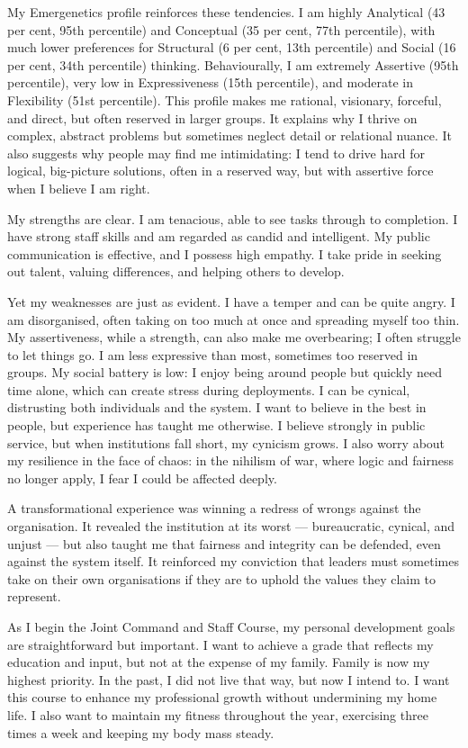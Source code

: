 My Emergenetics profile reinforces these tendencies. I am highly Analytical (43 per cent, 95th percentile) and Conceptual (35 per cent, 77th percentile), with much lower preferences for Structural (6 per cent, 13th percentile) and Social (16 per cent, 34th percentile) thinking. Behaviourally, I am extremely Assertive (95th percentile), very low in Expressiveness (15th percentile), and moderate in Flexibility (51st percentile). This profile makes me rational, visionary, forceful, and direct, but often reserved in larger groups. It explains why I thrive on complex, abstract problems but sometimes neglect detail or relational nuance. It also suggests why people may find me intimidating: I tend to drive hard for logical, big-picture solutions, often in a reserved way, but with assertive force when I believe I am right.

My strengths are clear. I am tenacious, able to see tasks through to completion. I have strong staff skills and am regarded as candid and intelligent. My public communication is effective, and I possess high empathy. I take pride in seeking out talent, valuing differences, and helping others to develop.

Yet my weaknesses are just as evident. I have a temper and can be quite angry. I am disorganised, often taking on too much at once and spreading myself too thin. My assertiveness, while a strength, can also make me overbearing; I often struggle to let things go. I am less expressive than most, sometimes too reserved in groups. My social battery is low: I enjoy being around people but quickly need time alone, which can create stress during deployments. I can be cynical, distrusting both individuals and the system. I want to believe in the best in people, but experience has taught me otherwise. I believe strongly in public service, but when institutions fall short, my cynicism grows. I also worry about my resilience in the face of chaos: in the nihilism of war, where logic and fairness no longer apply, I fear I could be affected deeply.

A transformational experience was winning a redress of wrongs against the organisation. It revealed the institution at its worst --- bureaucratic, cynical, and unjust --- but also taught me that fairness and integrity can be defended, even against the system itself. It reinforced my conviction that leaders must sometimes take on their own organisations if they are to uphold the values they claim to represent.

As I begin the Joint Command and Staff Course, my personal development goals are straightforward but important. I want to achieve a grade that reflects my education and input, but not at the expense of my family. Family is now my highest priority. In the past, I did not live that way, but now I intend to. I want this course to enhance my professional growth without undermining my home life. I also want to maintain my fitness throughout the year, exercising three times a week and keeping my body mass steady.

